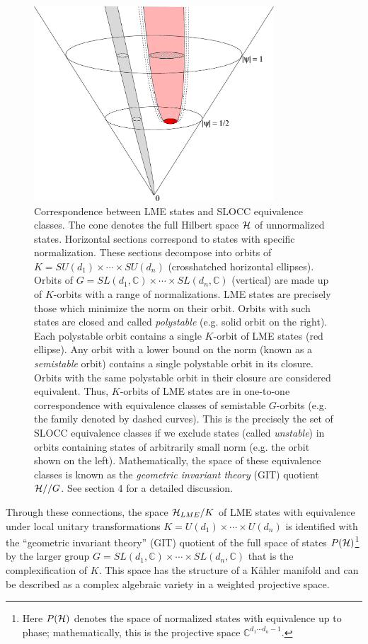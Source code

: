 \documentclass[12pt]{article}
\theoremstyle{definition}
\begin{document}
 \begin{figure}
\centering
\includegraphics[width=0.8\textwidth]{cone.eps}
\caption{Correspondence between LME states and SLOCC equivalence classes. The cone denotes the full Hilbert space ${\cal H}$ of unnormalized states. Horizontal sections correspond to states with specific normalization. These sections decompose into orbits of $K = SU(d_1) \times \cdots \times SU(d_n)$ (crosshatched horizontal ellipses). Orbits of $G = SL(d_1, \mathbb{C}) \times \cdots \times SL(d_n,\mathbb{C})$ (vertical) are made up of $K$-orbits with a range of normalizations. LME states are precisely those which minimize the norm on their orbit. Orbits with such states are closed and called {\it polystable} (e.g. solid orbit on the right). Each polystable orbit contains a single $K$-orbit of LME states (red ellipse). Any orbit with a lower bound on the norm (known as a {\it semistable} orbit) contains a single polystable orbit in its closure. Orbits with the same polystable orbit in their closure are considered equivalent. Thus, $K$-orbits of LME states are in one-to-one correspondence with equivalence classes of semistable $G$-orbits (e.g. the family denoted by dashed curves). This is the precisely the set of SLOCC equivalence classes if we exclude states (called {\it unstable}) in orbits containing states of arbitrarily small norm (e.g. the orbit shown on the left). Mathematically, the space of these equivalence classes is known as the {\it geometric invariant theory} (GIT) quotient ${\cal H}//G$. See section 4 for a detailed discussion.}
\label{fig:cone}
\end{figure}


Through these connections, the space ${\cal H}_{LME}/K$ of LME states with equivalence under local unitary transformations $K = U(d_1) \times \cdots \times U(d_n)$ is identified with the ``geometric invariant theory'' (GIT) quotient of the full space of states $P({\cal H})$\footnote{Here $P({\cal H})$ denotes the space of normalized states with equivalence up to phase; mathematically, this is the projective space $\mathbb{C}^{d_1 \cdots d_n -1}$.} by the larger group $G = SL(d_1, \mathbb{C}) \times \cdots \times SL(d_n, \mathbb{C})$ that is the complexification of $K$. This space has the structure of a K\"ahler manifold and can be described as a complex algebraic variety in a weighted projective space.
\end{document}
